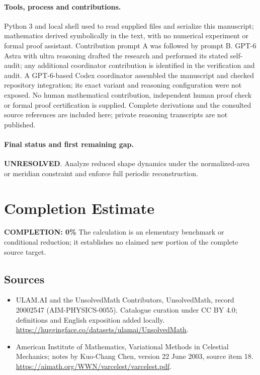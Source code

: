 \documentclass[11pt]{article}
\begin{document}
\paragraph{Tools, process and contributions.}
Python 3 and local shell used to read supplied files and serialize this manuscript; mathematics derived symbolically in the text, with no numerical experiment or formal proof assistant. Contribution prompt A was followed by prompt B. GPT-6 Astra with ultra reasoning drafted the research and performed its stated self-audit; any additional coordinator contribution is identified in the verification and audit. A GPT-6-based Codex coordinator assembled the manuscript and checked repository integration; its exact variant and reasoning configuration were not exposed. No human mathematical contribution, independent human proof check or formal proof certification is supplied. Complete derivations and the consulted source references are included here; private reasoning transcripts are not published.

\paragraph{Final status and first remaining gap.}
\textbf{UNRESOLVED}. Analyze reduced shape dynamics under the normalized-area or meridian constraint and enforce full periodic reconstruction.

\section{Completion Estimate}
\noindent\textbf{COMPLETION: 0\%}
The calculation is an elementary benchmark or conditional reduction; it establishes no claimed new portion of the complete source target.

\subsection{Sources}
\begin{itemize}
\item[\hypertarget{source:20002547:1}{S1}] ULAM.AI and the UnsolvedMath Contributors, UnsolvedMath, record 20002547 (AIM-PHYSICS-0055). Catalogue curation under CC BY 4.0; definitions and English exposition added locally.
\url{https://huggingface.co/datasets/ulamai/UnsolvedMath}.
\item[\hypertarget{source:20002547:2}{S2}] American Institute of Mathematics, Variational Methods in Celestial Mechanics; notes by Kuo-Chang Chen, version 22 June 2003, source item 18.
\url{https://aimath.org/WWN/varcelest/varcelest.pdf}.
\end{itemize}
\label{end:20002547}
\end{document}
